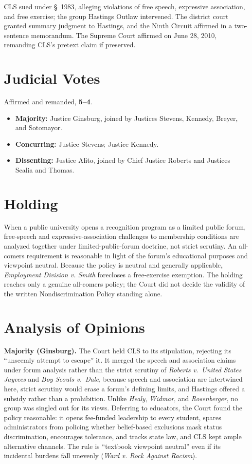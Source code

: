 \documentclass[12pt]{article}
\begin{document}
CLS sued under \S~1983, alleging violations of free speech, expressive association, and free exercise; the group Hastings Outlaw intervened. The district court granted summary judgment to Hastings, and the Ninth Circuit affirmed in a two-sentence memorandum. The Supreme Court affirmed on June 28, 2010, remanding CLS's pretext claim if preserved.

\section{Judicial Votes}

Affirmed and remanded, \textbf{5--4}.
\begin{itemize}
\item \textbf{Majority:} Justice Ginsburg, joined by Justices Stevens, Kennedy, Breyer, and Sotomayor.
\item \textbf{Concurring:} Justice Stevens; Justice Kennedy.
\item \textbf{Dissenting:} Justice Alito, joined by Chief Justice Roberts and Justices Scalia and Thomas.
\end{itemize}

\section{Holding}

When a public university opens a recognition program as a limited public forum, free-speech and expressive-association challenges to membership conditions are analyzed together under limited-public-forum doctrine, not strict scrutiny. An all-comers requirement is reasonable in light of the forum's educational purposes and viewpoint neutral. Because the policy is neutral and generally applicable, \textit{Employment Division v. Smith} forecloses a free-exercise exemption. The holding reaches only a genuine all-comers policy; the Court did not decide the validity of the written Nondiscrimination Policy standing alone.

\section{Analysis of Opinions}

\textbf{Majority (Ginsburg).} The Court held CLS to its stipulation, rejecting its ``unseemly attempt to escape'' it. It merged the speech and association claims under forum analysis rather than the strict scrutiny of \textit{Roberts v.\ United States Jaycees} and \textit{Boy Scouts v.\ Dale}, because speech and association are intertwined here, strict scrutiny would erase a forum's defining limits, and Hastings offered a subsidy rather than a prohibition. Unlike \textit{Healy}, \textit{Widmar}, and \textit{Rosenberger}, no group was singled out for its views. Deferring to educators, the Court found the policy reasonable: it opens fee-funded leadership to every student, spares administrators from policing whether belief-based exclusions mask status discrimination, encourages tolerance, and tracks state law, and CLS kept ample alternative channels. The rule is ``textbook viewpoint neutral'' even if its incidental burdens fall unevenly (\textit{Ward v. Rock Against Racism}).
\end{document}
